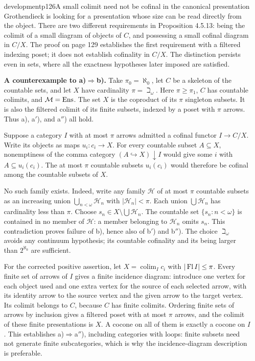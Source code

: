\begin{dcomment}{development}{p126}{A small colimit need not be cofinal in the canonical presentation}
Grothendieck is looking for a presentation whose size can be read directly from the object. There are two different requirements in Proposition 4.5.13: being the colimit of a small diagram of objects of $C$, and possessing a small cofinal diagram in $C/X$. The proof on page 129 establishes the first requirement with a filtered indexing poset; it does not establish cofinality in $C/X$. The distinction persists even in sets, where all the exactness hypotheses later imposed are satisfied.

\textbf{A counterexample to a)$\Rightarrow$b).}\ours{}
Take $\pi_0=\aleph_0$, let $C$ be a skeleton of the countable sets, and let $X$ have cardinality $\pi=\beth_\omega$. Here $\pi\geq\pi_1$, $C$ has countable colimits, and $\mathcal M=\mathrm{Ens}$. The set $X$ is the coproduct of its $\pi$ singleton subsets. It is also the filtered colimit of its finite subsets, indexed by a poset with $\pi$ arrows. Thus a), a$'$), and a$''$) all hold.

Suppose a category $I$ with at most $\pi$ arrows admitted a cofinal functor $I\to C/X$. Write its objects as maps $u_i:c_i\to X$. For every countable subset $A\subseteq X$, nonemptiness of the comma category $(A\hookrightarrow X)\downarrow I$ would give some $i$ with $A\subseteq u_i(c_i)$. The at most $\pi$ countable subsets $u_i(c_i)$ would therefore be cofinal among the countable subsets of $X$.

No such family exists. Indeed, write any family $\mathcal H$ of at most $\pi$ countable subsets as an increasing union $\bigcup_{n<\omega}\mathcal H_n$ with $|\mathcal H_n|<\pi$. Each union $\bigcup\mathcal H_n$ has cardinality less than $\pi$. Choose $s_n\in X\setminus\bigcup\mathcal H_n$. The countable set $\{s_n:n<\omega\}$ is contained in no member of $\mathcal H$: a member belonging to $\mathcal H_n$ omits $s_n$. This contradiction proves failure of b), hence also of b$'$) and b$''$). The choice $\beth_\omega$ avoids any continuum hypothesis; its countable cofinality and its being larger than $2^{\aleph_0}$ are sufficient.

For the corrected positive assertion, let $X=\operatorname{colim}_I c_i$ with $|\operatorname{Fl} I|\leq\pi$. Every finite set of arrows of $I$ gives a finite incidence diagram: introduce one vertex for each object used and one extra vertex for the source of each selected arrow, with its identity arrow to the source vertex and the given arrow to the target vertex. Its colimit belongs to $C$, because $C$ has finite colimits. Ordering finite sets of arrows by inclusion gives a filtered poset with at most $\pi$ arrows, and the colimit of these finite presentations is $X$. A cocone on all of them is exactly a cocone on $I$. This establishes a)$\Rightarrow$a$''$), including categories with loops: finite subsets need not generate finite subcategories, which is why the incidence-diagram description is preferable.


\end{dcomment}
